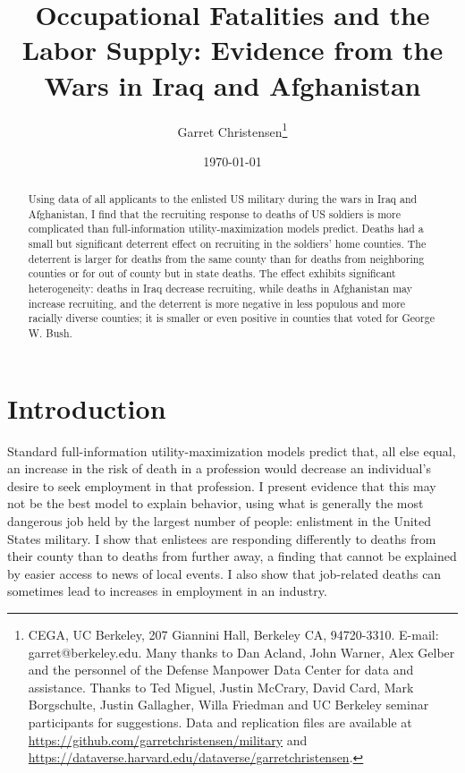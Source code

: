 \documentclass[12pt] {article}
\begin{document}
\title{Occupational Fatalities and the Labor Supply: Evidence from the Wars in Iraq and
Afghanistan}
\date{\today}
\author{Garret Christensen\thanks{
CEGA, UC Berkeley, 207 Giannini Hall, Berkeley CA, 94720-3310. E-mail: garret@berkeley.edu. 
Many thanks to Dan Acland, John Warner, Alex Gelber and the personnel
of the Defense Manpower Data Center for data and assistance. Thanks
to Ted Miguel, Justin McCrary, David Card, Mark Borgschulte, Justin
Gallagher, Willa Friedman and UC Berkeley seminar participants for
suggestions. Data and replication files are available at \url{https://github.com/garretchristensen/military} and \url{https://dataverse.harvard.edu/dataverse/garretchristensen}.}}
\maketitle



\begin{abstract}

Using data of all applicants to the enlisted US military during the wars in Iraq and Afghanistan, I find that the recruiting response to deaths of US soldiers is more complicated than full-information utility-maximization models predict. Deaths had a small but significant deterrent effect on recruiting in the soldiers' home counties. The deterrent is larger for deaths from the same county than for deaths from neighboring counties or for out of county but in state deaths. %
The effect exhibits significant heterogeneity: deaths in Iraq decrease recruiting, while deaths in Afghanistan may increase recruiting, and the deterrent is more negative in less populous and more racially diverse counties; it is smaller or even positive in counties that voted for George W. Bush.

\end{abstract}




\section{Introduction\label{sec:Introduction}}
Standard full-information utility-maximization models predict that, all else equal, an increase in the risk of death in a profession would decrease an individual's desire to seek employment in that profession. I present evidence that this may not be the best model to explain behavior, using what is generally the most dangerous job held by the largest number of people: enlistment in the United States military. I show that enlistees are responding differently to deaths from their county than to deaths from further away, a finding that cannot be explained by easier access to news of local events. I also show that job-related deaths can sometimes lead to increases in employment in an industry.
\end{document}

